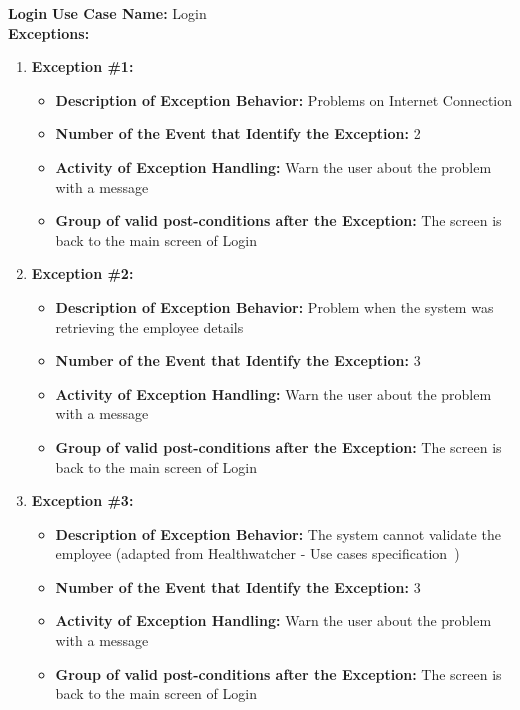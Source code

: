 \documentclass[11pt,twoside]{article}
\begin{document}
\textbf{Login}
\textbf{Use Case Name:} Login\\
\textbf{Exceptions:}
\begin{enumerate}
 \item \textbf{Exception \#1:}
 \begin{itemize}
  \item \textbf{Description of Exception Behavior:} Problems on Internet Connection
  \item \textbf{Number of the Event that Identify the Exception:} 2
  \item \textbf{Activity of Exception Handling:} Warn the user about the problem with a message
  \item \textbf{Group of valid post-conditions after the Exception:} The screen is back to the main screen of Login
 \end{itemize}
 \item \textbf{Exception \#2:}
 \begin{itemize}
  \item \textbf{Description of Exception Behavior:} Problem when the system was retrieving the employee details
  \item \textbf{Number of the Event that Identify the Exception:} 3
  \item \textbf{Activity of Exception Handling:} Warn the user about the problem with a message
  \item \textbf{Group of valid post-conditions after the Exception:} The screen is back to the main screen of Login
 \end{itemize}
 \item \textbf{Exception \#3:}
 \begin{itemize}
  \item \textbf{Description of Exception Behavior:} The system cannot validate the employee (adapted from Healthwatcher - Use cases
specification~\cite{hw-usecase})
  \item \textbf{Number of the Event that Identify the Exception:} 3
  \item \textbf{Activity of Exception Handling:} Warn the user about the problem with a message
  \item \textbf{Group of valid post-conditions after the Exception:} The screen is back to the main screen of Login
 \end{itemize}
\end{enumerate}
\end{document}
